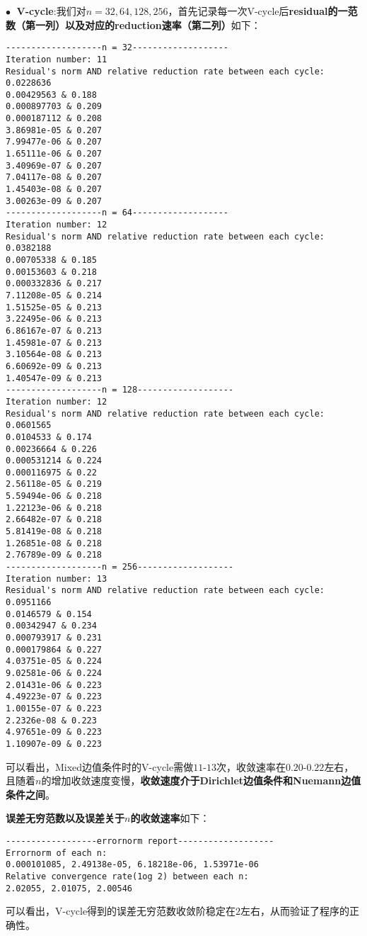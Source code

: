 \documentclass{ctexart}
\begin{document}
\begin{sloppypar}
$\bullet \;$ \textbf{V-cycle}:我们对$n=32,64,128,256$，首先记录每一次V-cycle后\textbf{residual的一范数（第一列）以及对应的reduction速率（第二列）}如下：
\begin{shaded}
\begin{verbatim}
-------------------n = 32-------------------
Iteration number: 11
Residual's norm AND relative reduction rate between each cycle: 
0.0228636
0.00429563 & 0.188
0.000897703 & 0.209
0.000187112 & 0.208
3.86981e-05 & 0.207
7.99477e-06 & 0.207
1.65111e-06 & 0.207
3.40969e-07 & 0.207
7.04117e-08 & 0.207
1.45403e-08 & 0.207
3.00263e-09 & 0.207
-------------------n = 64-------------------
Iteration number: 12
Residual's norm AND relative reduction rate between each cycle: 
0.0382188
0.00705338 & 0.185
0.00153603 & 0.218
0.000332836 & 0.217
7.11208e-05 & 0.214
1.51525e-05 & 0.213
3.22495e-06 & 0.213
6.86167e-07 & 0.213
1.45981e-07 & 0.213
3.10564e-08 & 0.213
6.60692e-09 & 0.213
1.40547e-09 & 0.213
-------------------n = 128-------------------
Iteration number: 12
Residual's norm AND relative reduction rate between each cycle: 
0.0601565
0.0104533 & 0.174
0.00236664 & 0.226
0.000531214 & 0.224
0.000116975 & 0.22
2.56118e-05 & 0.219
5.59494e-06 & 0.218
1.22123e-06 & 0.218
2.66482e-07 & 0.218
5.81419e-08 & 0.218
1.26851e-08 & 0.218
2.76789e-09 & 0.218
-------------------n = 256-------------------
Iteration number: 13
Residual's norm AND relative reduction rate between each cycle: 
0.0951166
0.0146579 & 0.154
0.00342947 & 0.234
0.000793917 & 0.231
0.000179864 & 0.227
4.03751e-05 & 0.224
9.02581e-06 & 0.224
2.01431e-06 & 0.223
4.49223e-07 & 0.223
1.00155e-07 & 0.223
2.2326e-08 & 0.223
4.97651e-09 & 0.223
1.10907e-09 & 0.223
\end{verbatim}
\end{shaded}
可以看出，Mixed边值条件时的V-cycle需做$11$-$13$次，收敛速率在$0.20$-$0.22$左右，且随着$n$的增加收敛速度变慢，\textbf{收敛速度介于Dirichlet边值条件和Nuemann边值条件之间}。

\textbf{误差无穷范数以及误差关于$n$的收敛速率}如下：
\begin{shaded}
\begin{verbatim}
------------------errornorm report-------------------
Errornorm of each n: 
0.000101085, 2.49138e-05, 6.18218e-06, 1.53971e-06 
Relative convergence rate(1og 2) between each n: 
2.02055, 2.01075, 2.00546
\end{verbatim} 
\end{shaded}
可以看出，V-cycle得到的误差无穷范数收敛阶稳定在$2$左右，从而验证了程序的正确性。


\end{sloppypar}
\end{document}
